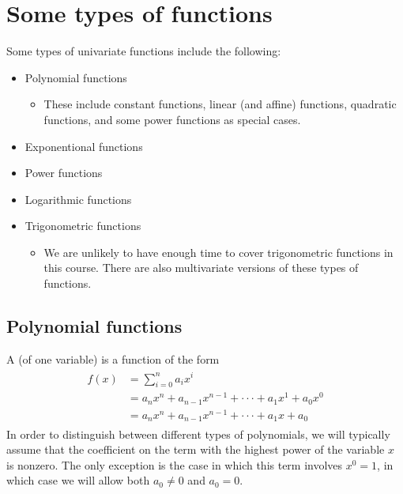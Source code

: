 \documentclass[letterpaper,10pt,english]{jupyterBook}
\begin{document}
\section{Some types of functions}
\label{\detokenize{03.mappings_functions_correspondences:some-types-of-functions}}
\sphinxAtStartPar
Some types of univariate functions include the following:
\begin{itemize}
\item {} 
\sphinxAtStartPar
Polynomial functions
\begin{itemize}
\item {} 
\sphinxAtStartPar
These include constant functions, linear (and affine) functions, quadratic functions, and some power functions as special cases.

\end{itemize}

\item {} 
\sphinxAtStartPar
Exponentional functions

\item {} 
\sphinxAtStartPar
Power functions

\item {} 
\sphinxAtStartPar
Logarithmic functions

\item {} 
\sphinxAtStartPar
Trigonometric functions
\begin{itemize}
\item {} 
\sphinxAtStartPar
We are unlikely to have enough time to cover trigonometric functions in this course.
There are also multivariate versions of these types of functions.

\end{itemize}

\end{itemize}


\subsection{Polynomial functions}
\label{\detokenize{03.mappings_functions_correspondences:polynomial-functions}}
\sphinxAtStartPar
A  (of one variable) is a function of the form
\begin{equation*}
\begin{split}
\begin{align*}
f(x) &= \sum_{i = 0}^n a_i x^i
\\
&= a_n x^n + a_{n − 1} x^{n − 1} + · · · + a_1 x^1 + a_0 x^0
\\
&= a_n x^n + a_{n − 1} x^{n − 1} + · · · + a_1 x + a_0
\end{align*}
\end{split}
\end{equation*}
\sphinxAtStartPar
In order to distinguish between different types of polynomials, we will typically assume that the coefficient on the term with the highest power of the variable \(x\) is non\sphinxhyphen{}zero. The only exception is the case in which this term involves \(x^0 = 1\), in which case we will allow both \(a_0 \ne 0\) and \(a_0 = 0\).
\end{document}
